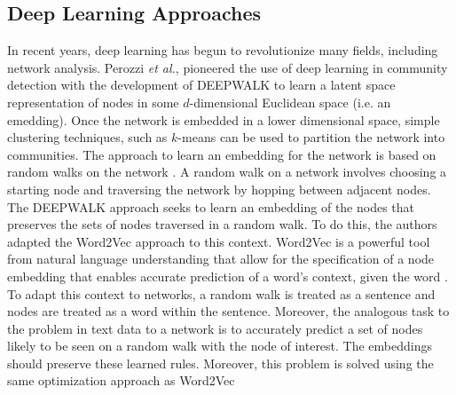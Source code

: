 \subsection{Deep Learning Approaches}
\indent In recent years, deep learning has begun to revolutionize many fields, including network analysis. Perozzi \emph{et al.}, pioneered the use of deep learning in community detection with the development of DEEPWALK \cite{deepWalk} to learn a latent space representation of nodes in some $d$-dimensional Euclidean space (i.e. an emedding). Once the network is embedded in a lower dimensional space, simple clustering techniques, such as $k$-means \cite{kMean} can be used to partition the network into communities. The approach to learn an embedding for the network is based on random walks on the network \cite{rWalk,gleichpagerank}. A random walk on a network involves choosing a starting node and traversing the network by hopping between adjacent nodes. The DEEPWALK approach seeks to learn an embedding of the nodes that preserves the sets of nodes traversed in a random walk. To do this, the authors adapted the Word2Vec approach to this context. Word2Vec is a powerful tool from natural language understanding that allow for the specification of a node embedding that enables accurate prediction of a word's context, given the word \cite{word2Vec}. To adapt this context to networks, a random walk is treated as a sentence and nodes are treated as a word within the sentence. Moreover, the analogous task to the problem in text data to a network is to accurately predict a set of nodes likely to be seen on a random walk with the node of interest. The embeddings should preserve these learned rules. Moreover, this problem is solved using the same optimization approach as Word2Vec \\
